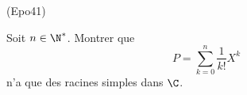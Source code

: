 \begin{tiny}(Epo41)\end{tiny} Soit $n\in \N^*$. Montrer que 
\[
  P = \sum_{k=0}^n \frac{1}{k!} X^k
\]
n'a que des racines simples dans $\C$.
